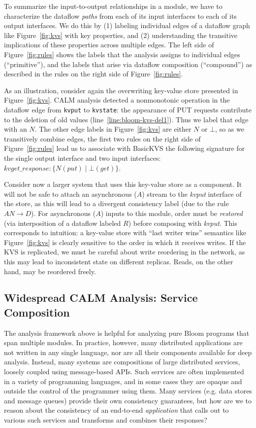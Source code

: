 To summarize the input-to-output relationships in a module, we have to characterize the dataflow \emph{paths} from each of its input interfaces to each of its output interfaces.  We do this by (1) labeling individual edges of a dataflow graph like Figure~\ref{fig:kvs} with key properties, and (2) understanding the transitive implications of these properties across multiple edges.  The left side of Figure~\ref{fig:rules} shows the labels that the analysis assigns to individual edges (``primitive''), and the labels that arise via dataflow composition (``compound'') as described in the rules on the right side of Figure~\ref{fig:rules}.  

As an illustration, consider again the overwriting key-value store presented in Figure~\ref{fig:kvs}.
CALM analysis detected a nonmonotonic operation in the dataflow edge from \texttt{kvput} to \texttt{kvstate}: the appearance of PUT requests contribute to the deletion of old values (line~\ref{line:bloom-kvs-del1}).  Thus we label that edge with an $N$.  The other edge labels in Figure~\ref{fig:kvs} are either $N$ or $\bot$, so as we transitively combine edges, the first two rules on the right side of Figure~\ref{fig:rules} lead us to associate with BasicKVS the following signature for the single output interface and two input interfaces:
$kvget\_response: \{N(put) \; | \; \bot(get)\}$.  

Consider now a larger system that uses this key-value store as a component.  It will not be safe to attach an asynchronous ($A$)
stream to the \emph{kvput} interface of the store, as this will lead to a divergent consistency label
(due to the rule $AN \rightarrow D$).  For asynchronous ($A$) inputs to this module,
order must be \emph{restored} (via
interposition of a dataflow labeled $R$) 
before composing with \emph{kvput}.  This corresponds to intuition:
a key-value store with ``last writer wins'' semantics like Figure~\ref{fig:kvs} is clearly sensitive to the order in which it receives writes.
If the KVS is replicated, we must be careful about write reordering in the network, as this
may lead to inconsistent state on different replicas.
Reads, on the other hand, may be reordered freely.

\subsection{Widespread CALM Analysis: Service Composition}
The analysis framework above is helpful for analyzing pure Bloom programs that span multiple modules.
In practice, however, many distributed applications are not written in any single language, nor are all their components available for deep analysis.  Instead, many systems are compositions of large distributed services, loosely coupled using message-based APIs.
Such services are often implemented in a variety of programming 
languages, and in some cases they are opaque and outside the control of
the programmer using them.  
Many services (e.g. data stores and message queues) provide their own 
consistency guarantees, but how are we to reason about the consistency of an end-to-end
\emph{application} that calls out to various such services and transforms
and combines their responses?  

